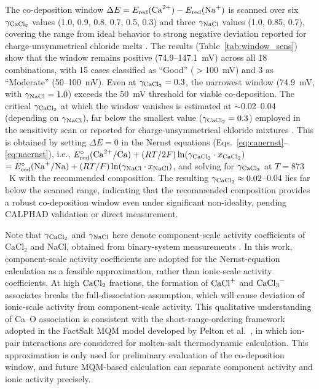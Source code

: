 \documentclass[11pt]{article}
\begin{document}
The co-deposition window $\Delta E = E_{\mathrm{red}}(\ce{Ca^{2+}}) - E_{\mathrm{red}}(\ce{Na+})$ is scanned over six $\gamma_{\ce{CaCl2}}$ values (1.0, 0.9, 0.8, 0.7, 0.5, 0.3) and three $\gamma_{\ce{NaCl}}$ values (1.0, 0.85, 0.7), covering the range from ideal behavior to strong negative deviation reported for charge-unsymmetrical chloride melts \cite{kleppa1966}. The results (Table~\ref{tab:window_sens}) show that the window remains positive (74.9--147.1~mV) across all 18 combinations, with 15 cases classified as ``Good'' ($>$100~mV) and 3 as ``Moderate'' (50--100~mV). Even at $\gamma_{\ce{CaCl2}} = 0.3$, the narrowest window (74.9~mV, with $\gamma_{\ce{NaCl}} = 1.0$) exceeds the 50~mV threshold for viable co-deposition. The critical $\gamma_{\ce{CaCl2}}$ at which the window vanishes is estimated at $\sim$0.02--0.04 (depending on $\gamma_{\ce{NaCl}}$), far below the smallest value ($\gamma_{\ce{CaCl2}} = 0.3$) employed in the sensitivity scan or reported for charge-unsymmetrical chloride mixtures \cite{chartrand2000,kleppa1966}. This is obtained by setting $\Delta E = 0$ in the Nernst equations (Eqs.~\ref{eq:canernst}--\ref{eq:naernst}), i.e., $E^{\circ}_{\mathrm{red}}(\ce{Ca^{2+}/Ca}) + (RT/2F)\ln(\gamma_{\ce{CaCl2}} \cdot x_{\ce{CaCl2}})$ $= E^{\circ}_{\mathrm{red}}(\ce{Na+/Na}) + (RT/F)\ln(\gamma_{\ce{NaCl}} \cdot x_{\ce{NaCl}})$, and solving for $\gamma_{\ce{CaCl2}}$ at $T = 873$~K with the recommended composition. The resulting $\gamma_{\ce{CaCl2}} \approx 0.02$--0.04 lies far below the scanned range, indicating that the recommended composition provides a robust co-deposition window even under significant non-ideality, pending CALPHAD validation or direct measurement.

Note that $\gamma_{\ce{CaCl2}}$ and $\gamma_{\ce{NaCl}}$ here denote component-scale activity coefficients of CaCl$_2$ and NaCl, obtained from binary-system measurements \cite{chartrand2000,kleppa1966}. In this work, component-scale activity coefficients are adopted for the Nernst-equation calculation as a feasible approximation, rather than ionic-scale activity coefficients. At high $\ce{CaCl2}$ fractions, the formation of $\ce{CaCl+}$ and $\ce{CaCl3-}$ associates breaks the full-dissociation assumption, which will cause deviation of ionic-scale activity from component-scale activity. This qualitative understanding of Ca--O association is consistent with the short-range-ordering framework adopted in the FactSalt MQM model developed by Pelton et al.\ \cite{pelton2000mqm}, in which ion-pair interactions are considered for molten-salt thermodynamic calculation. This approximation is only used for preliminary evaluation of the co-deposition window, and future MQM-based calculation can separate component activity and ionic activity precisely.
\end{document}
